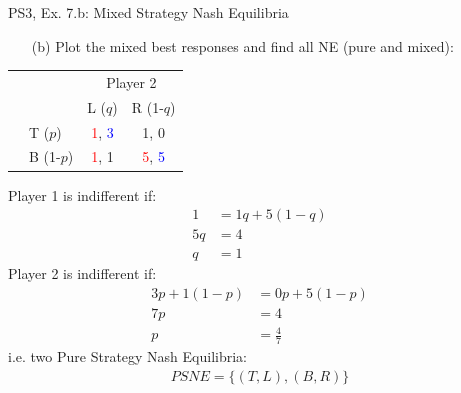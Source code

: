 \begin{frame}{PS3, Ex. 7.b: Mixed Strategy Nash Equilibria}
  \begin{multicols}{2}
    \begin{itemize}
      \item[(b)] Plot the mixed best responses and find all NE (pure and mixed):
    \end{itemize}
    \begin{table}
      \begin{tabular}{cl|c|c|}
        & \multicolumn{1}{c}{} & \multicolumn{2}{c}{\color{blue}Player 2}\\
        \parbox[t]{1mm}{}
        &  &  &  \\
        & T  ($p$)  & \textcolor{red}{1}, \textcolor{blue}{3} & 1, 0 \\
        & B  (1-$p$)& \textcolor{red}{1}, 1 & \textcolor{red}{5}, \textcolor{blue}{5} \\
      \end{tabular}
    \end{table}
    Player 1 is indifferent if:
    \begin{align*}
      1 &= 1q + 5(1-q) \\
      5q&= 4          \\
      q &= 1
    \end{align*}
    Player 2 is indifferent if:
    \begin{align*}
      3p + 1(1-p)&= 0p+5(1-p)\\
      7p         &= 4     \\
      p          &= \frac{4}{7}
    \end{align*}
    i.e. two Pure Strategy Nash Equilibria:
    \begin{align*}
      PSNE=\{(T,L),(B,R)\}
    \end{align*}
  \vfill\null \columnbreak
  \vfill\null
  \end{multicols}
\end{frame}
